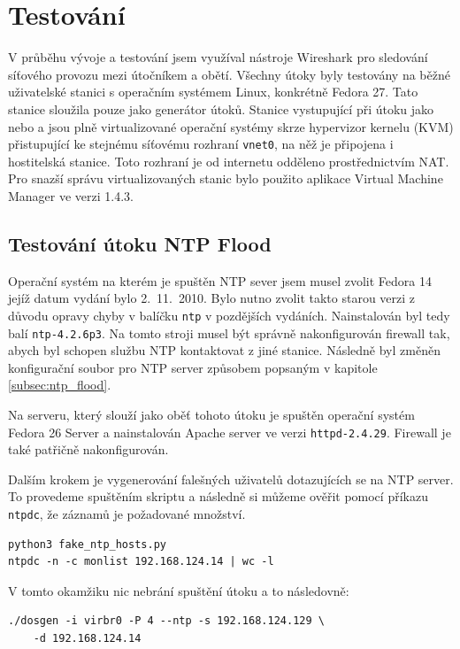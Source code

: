 \chapter{Testování}
\label{chap:testovani}
V průběhu vývoje a testování jsem využíval nástroje Wireshark pro sledování síťového provozu mezi útočníkem a obětí. Všechny útoky byly testovány na běžné uživatelské stanici s operačním systémem Linux, konkrétně Fedora 27. Tato stanice sloužila pouze jako generátor útoků. Stanice vystupující při útoku jako  nebo  a  jsou plně virtualizované operační systémy skrze hypervizor kernelu (KVM) přistupující ke stejnému síťovému rozhraní \texttt{vnet0}, na něž je připojena i hostitelská stanice. Toto rozhraní je od internetu odděleno prostřednictvím NAT. Pro snazší správu virtualizovaných stanic bylo použito aplikace Virtual Machine Manager ve verzi 1.4.3.

\section{Testování útoku NTP Flood}
Operační systém na kterém je spuštěn NTP sever jsem musel zvolit Fedora 14 jejíž datum vydání bylo 2.\ 11.\ 2010. Bylo nutno zvolit takto starou verzi z důvodu opravy chyby v balíčku \texttt{ntp} v pozdějších vydáních. Nainstalován byl tedy balí \texttt{ntp-4.2.6p3}. Na tomto stroji musel být správně nakonfigurován firewall tak, abych byl schopen službu NTP kontaktovat z jiné stanice. Následně byl změněn konfigurační soubor pro NTP server způsobem popsaným v kapitole \ref{subsec:ntp_flood}.

Na serveru, který slouží jako oběť tohoto útoku je spuštěn operační systém Fedora 26 Server a nainstalován Apache server ve verzi \texttt{httpd-2.4.29}. Firewall je také patřičně nakonfigurován.

Dalším krokem je vygenerování falešných uživatelů dotazujících se na NTP server. To provedeme spuštěním skriptu a následně si můžeme ověřit pomocí příkazu \texttt{ntpdc}, že záznamů je požadované množství.
\begin{lstlisting}
python3 fake_ntp_hosts.py
ntpdc -n -c monlist 192.168.124.14 | wc -l
\end{lstlisting}

\noindent V tomto okamžiku nic nebrání spuštění útoku a to následovně:
\begin{lstlisting}
./dosgen -i virbr0 -P 4 --ntp -s 192.168.124.129 \
	-d 192.168.124.14
\end{lstlisting}

